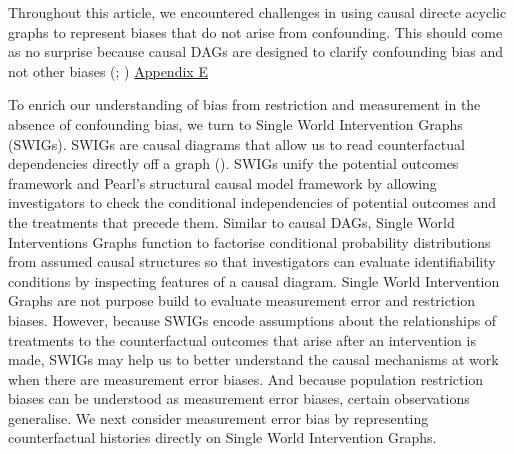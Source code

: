 \documentclass[
  single column]{article}
\begin{document}
Throughout this article, we encountered challenges in using causal
directe acyclic graphs to represent biases that do not arise from
confounding. This should come as no surprise because causal DAGs are
designed to clarify confounding bias and not other biases
(;
) \hyperref[id-app_E]{Appendix E}

To enrich our understanding of bias from restriction and measurement in
the absence of confounding bias, we turn to Single World Intervention
Graphs (SWIGs). SWIGs are causal diagrams that allow us to read
counterfactual dependencies directly off a graph
(). SWIGs
unify the potential outcomes framework and Pearl's structural causal
model framework by allowing investigators to check the conditional
independencies of potential outcomes and the treatments that precede
them. Similar to causal DAGs, Single World Interventions Graphs function
to factorise conditional probability distributions from assumed causal
structures so that investigators can evaluate identifiability conditions
by inspecting features of a causal diagram. Single World Intervention
Graphs are not purpose build to evaluate measurement error and
restriction biases. However, because SWIGs encode assumptions about the
relationships of treatments to the counterfactual outcomes that arise
after an intervention is made, SWIGs may help us to better understand
the causal mechanisms at work when there are measurement error biases.
And because population restriction biases can be understood as
measurement error biases, certain observations generalise. We next
consider measurement error bias by representing counterfactual histories
directly on Single World Intervention Graphs.
\end{document}
